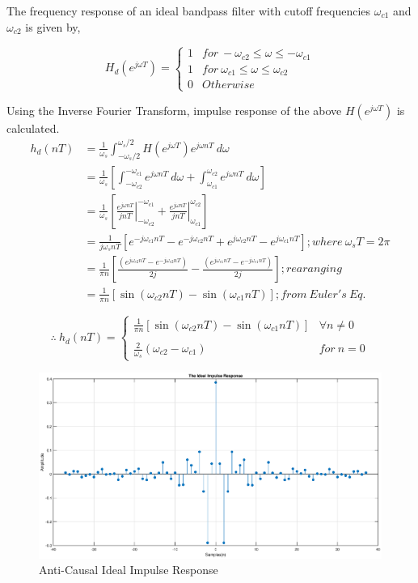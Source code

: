 \documentclass[a4paper,11pt]{article}%
\begin{document}
The frequency response of an ideal bandpass filter with cutoff frequencies $\omega_{c1}$ and $\omega_{c2}$ is given by,

\[
H_d(e^{j\omega T}) = \begin{cases}
1& for~ -\omega_{c2} \le \omega \le -\omega_{c1}\\
1& for ~\omega_{c1} \le \omega \le \omega_{c2}\\
0& Otherwise
\end{cases}
\]

Using the Inverse Fourier Transform, impulse response of the above $H(e^{j\omega T})$ is calculated.
\[
\begin{split}
	h_d(nT) &=\frac{1}{\omega_s}\int_{-\omega_s/2}^{\omega_s/2} H(e^{j\omega T})e^{j\omega nT}~d\omega\\
	&=\frac{1}{\omega_s}\left[\int_{-\omega_{c2}}^{-\omega_{c1}} e^{j\omega nT} ~d\omega+ \int_{\omega_{c1}}^{\omega_{c2}} e^{j\omega nT}~ d\omega\right]\\
	&=\frac{1}{\omega_s} \left[ \left.\frac{e^{j\omega nT}}{jn T}\right|_{-\omega_{c2}}^{-\omega_{c1}} + \left.\frac{e^{j\omega nT}}{jn T}\right|_{\omega_{c1}}^{\omega_{c2}} \right]\\
	&= \frac{1}{j\omega_s nT} \left[  e^{-j\omega_{c1}nT} - e^{-j\omega_{c2}nT}  +  e^{j\omega_{c2}nT} - e^{j\omega_{c1}nT}  \right] ; where~\omega_sT = 2\pi\\
	&= \frac{1}{\pi n}\left[ \frac{(e^{j\omega_{c2}nT} - e^{-j\omega_{c2}nT})}{2j} - \frac{(e^{j\omega_{c1}nT} - e^{-j\omega_{c1}nT})}{2j}  \right] ; rearanging\\
	&=	\frac{1}{\pi n}\left[   \sin(\omega_{c2}nT) - \sin(\omega_{c1}nT)  \right]; from~ Euler's ~Eq.
\end{split}
\]

\begin{equation}
	\therefore ~ h_d(nT) = \begin{cases}
		\frac{1}{\pi n}\left[   \sin(\omega_{c2}nT) - \sin(\omega_{c1}nT)  \right] & \forall n \ne 0\\
		&\\
		\frac{2}{\omega_s}\left( \omega_{c2} - \omega_{c1}\right)& for~ n = 0
	\end{cases}
\label{idealresponse}
\end{equation}

\begin{figure}[!h]
	\centering
	\includegraphics[scale=0.4]{figures/ideal-impulse}
	\caption{Anti-Causal Ideal Impulse Response}
\end{figure}
\end{document}

